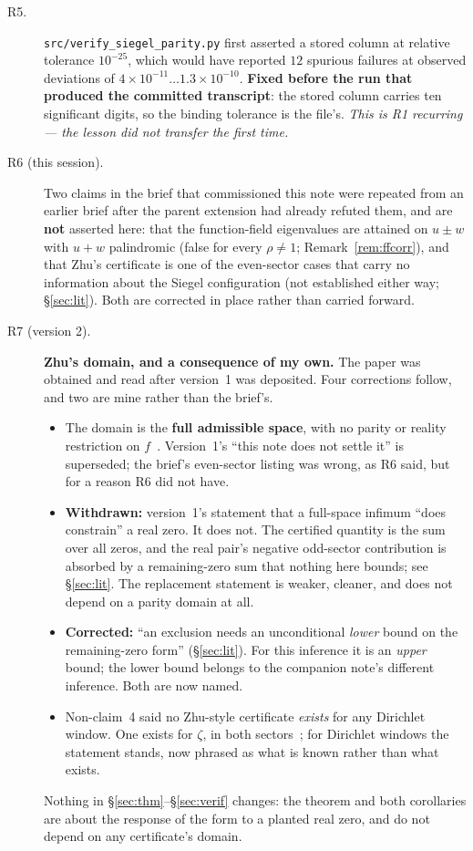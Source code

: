 \documentclass[11pt,a4paper]{article}
\theoremstyle{remark}
\newcommand{\src}[1]{{\footnotesize\texttt{#1}}}
\begin{document}
\begin{description}
\item[R5.] \src{src/verify\_siegel\_parity.py} first asserted a stored column at relative
tolerance $10^{-25}$, which would have reported $12$ spurious failures at observed
deviations of $4\times10^{-11}\ldots1.3\times10^{-10}$. \textbf{Fixed before the run that
produced the committed transcript}: the stored column carries ten significant digits, so
the binding tolerance is the file's. \emph{This is R1 recurring --- the lesson did not
transfer the first time.}

\item[R6 (this session).] Two claims in the brief that commissioned this note were repeated
from an earlier brief after the parent extension had already refuted them, and are
\textbf{not} asserted here: that the function-field eigenvalues are attained on $u\pm w$
with $u+w$ palindromic (false for every $\rho\ne1$; Remark~\ref{rem:ffcorr}), and that
Zhu's certificate is one of the even-sector cases that carry no information about the
Siegel configuration (not established either way; \S\ref{sec:lit}). Both are corrected in
place rather than carried forward.

\item[R7 (version 2).] \textbf{Zhu's domain, and a consequence of my own.} The paper was
obtained and read after version~1 was deposited. Four corrections follow, and two are mine
rather than the brief's.
\begin{itemize}\itemsep2pt
\item The domain is the \textbf{full admissible space}, with no parity or reality restriction
on $f$~\cite[Cor.~6.3]{Zhu}. Version~1's ``this note does not settle it'' is superseded; the
brief's even-sector listing was wrong, as R6 said, but for a reason R6 did not have.
\item \textbf{Withdrawn:} version~1's statement that a full-space infimum ``does constrain''
a real zero. It does not. The certified quantity is the sum over all zeros, and the real
pair's negative odd-sector contribution is absorbed by a remaining-zero sum that nothing here
bounds; see \S\ref{sec:lit}. The replacement statement is weaker, cleaner, and does not
depend on a parity domain at all.
\item \textbf{Corrected:} ``an exclusion needs an unconditional \emph{lower} bound on the
remaining-zero form'' (\S\ref{sec:lit}). For this inference it is an \emph{upper} bound; the
lower bound belongs to the companion note's different inference. Both are now named.
\item Non-claim~4 said no Zhu-style certificate \emph{exists} for any Dirichlet window. One
exists for $\zeta$, in both sectors~\cite[Thm.~6.2]{Zhu}; for Dirichlet windows the statement
stands, now phrased as what is known rather than what exists.
\end{itemize}
Nothing in \S\ref{sec:thm}--\S\ref{sec:verif} changes: the theorem and both corollaries are
about the response of the form to a planted real zero, and do not depend on any
certificate's domain.


\end{description}
\end{document}
